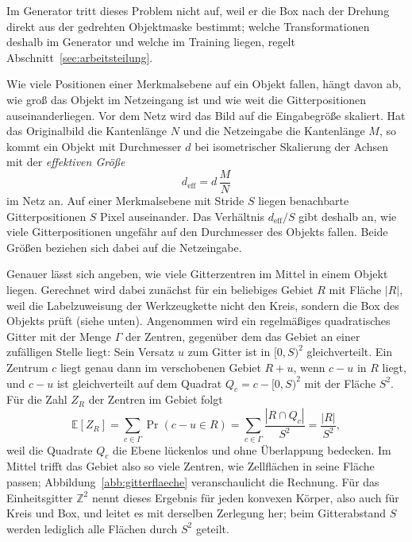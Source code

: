 Im Generator tritt dieses Problem nicht auf, weil er die Box nach der Drehung
direkt aus der gedrehten Objektmaske bestimmt; welche Transformationen deshalb
im Generator und welche im Training liegen, regelt
Abschnitt~\ref{sec:arbeitsteilung}.

\label{subsec:kleine-objekte}
Wie viele Positionen einer Merkmalsebene auf ein Objekt fallen, hängt davon ab,
wie groß das Objekt im Netzeingang ist und wie weit die Gitterpositionen
auseinanderliegen. Vor dem Netz wird das Bild auf die Eingabegröße skaliert.
Hat das Originalbild die Kantenlänge $N$ und die Netzeingabe die Kantenlänge
$M$, so kommt ein Objekt mit Durchmesser $d$ bei isometrischer Skalierung der
Achsen mit der \emph{effektiven Größe}
\begin{equation}
  d_{\mathrm{eff}} = d\,\frac{M}{N}
  \label{eq:deff}
\end{equation}
im Netz an. Auf einer Merkmalsebene mit Stride $S$ liegen benachbarte
Gitterpositionen $S$ Pixel auseinander. Das Verhältnis $d_{\mathrm{eff}}/S$ gibt
deshalb an, wie viele Gitterpositionen ungefähr auf den Durchmesser des Objekts
fallen. Beide Größen beziehen sich dabei auf die Netzeingabe.

Genauer lässt sich angeben, wie viele Gitterzentren im Mittel in einem Objekt
liegen. Gerechnet wird dabei zunächst für ein beliebiges Gebiet $R$ mit Fläche
$|R|$, weil die Labelzuweisung der Werkzeugkette nicht den Kreis, sondern die
Box des Objekts prüft (siehe unten). Angenommen wird ein regelmäßiges
quadratisches Gitter mit der Menge $\Gamma$ der Zentren, gegenüber dem das
Gebiet an einer zufälligen Stelle liegt: Sein Versatz $u$ zum Gitter ist in
$[0,S)^2$ gleichverteilt. Ein Zentrum $c$ liegt genau dann im verschobenen
Gebiet $R+u$, wenn $c-u$ in $R$ liegt, und $c-u$ ist gleichverteilt auf dem
Quadrat $Q_c = c-[0,S)^2$ mit der Fläche $S^2$. Für die Zahl $Z_R$ der Zentren
im Gebiet folgt
\begin{equation}
  \mathbb{E}[Z_R]
  =
  \sum_{c\in\Gamma} \Pr(c-u \in R)
  =
  \sum_{c\in\Gamma} \frac{|R\cap Q_c|}{S^{2}}
  =
  \frac{|R|}{S^{2}},
  \label{eq:gridarea}
\end{equation}
weil die Quadrate $Q_c$ die Ebene lückenlos und ohne Überlappung bedecken. Im
Mittel trifft das Gebiet also so viele Zentren, wie Zellflächen in seine Fläche
passen; Abbildung~\ref{abb:gitterflaeche} veranschaulicht die Rechnung. Für
das Einheitsgitter $\mathbb{Z}^2$ nennt \textcite{tokmachev2024} dieses
Ergebnis für jeden konvexen Körper, also auch für Kreis und Box, und leitet es
mit derselben Zerlegung her; beim Gitterabstand $S$ werden lediglich alle
Flächen durch $S^2$ geteilt.


